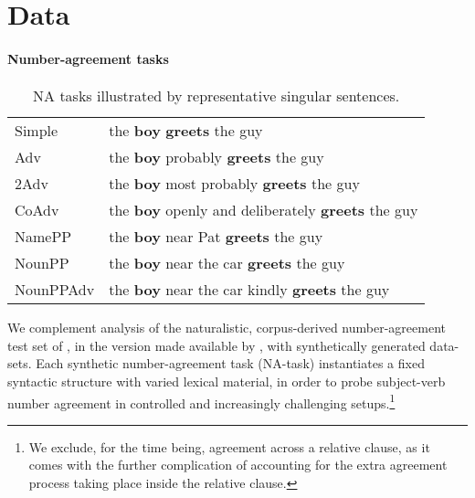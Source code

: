 \section{Data}\label{sec:the_data}

\paragraph{Number-agreement tasks}
\begin{table}[tb]
  \centering
  \begin{footnotesize}
  \begin{tabular}{l@{\hskip1pt}l}
    \B Simple & the \textbf{boy} \textbf{greets} the guy\\
    \B Adv & the \textbf{boy} probably \textbf{greets} the guy\\
    \B 2Adv & the \textbf{boy} most probably \textbf{greets} the guy\\
    \B CoAdv &  the \textbf{boy} openly and deliberately \textbf{greets} the guy\\
    \B NamePP & the \textbf{boy} near Pat \textbf{greets} the guy\\
    \B NounPP & the \textbf{boy} near the car \textbf{greets} the guy\\
    \B NounPPAdv & the \textbf{boy} near the car kindly \textbf{greets} the guy\\
  \end{tabular}
  \end{footnotesize}
  \caption{NA tasks illustrated by representative
    singular sentences.}
  \label{tab:data-sets}
\end{table}

We complement analysis of the naturalistic, corpus-derived
number-agreement test set of , in the
version made available by , with
synthetically generated data-sets. Each synthetic number-agreement
task (NA-task) instantiates a fixed syntactic structure with varied
lexical material, in order to probe subject-verb number agreement in
controlled and increasingly challenging setups.\footnote{We exclude,
  for the time being, agreement across a relative clause, as it comes
  with the further complication of accounting for the extra agreement
  process taking place inside the relative clause. }

